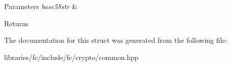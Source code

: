 \begin{DoxyParams}{Parameters}
{\em base58str} & \\
\hline
\end{DoxyParams}
\begin{DoxyReturn}{Returns}

\end{DoxyReturn}


The documentation for this struct was generated from the following file\+:\begin{DoxyCompactItemize}
\item 
libraries/fc/include/fc/crypto/common.\+hpp\end{DoxyCompactItemize}
